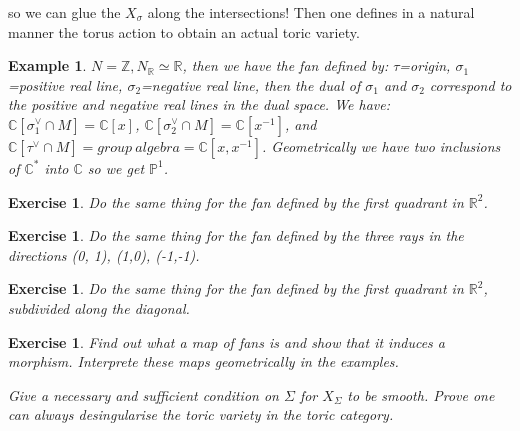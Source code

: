 \documentclass[a4paper]{article}
\newtheorem{eg}[thm]{Example}
\newtheorem{ex}[thm]{Exercise}
\newcommand{\R}{\mathbb{R}}
\newcommand{\C}{\mathbb{C}}
\newcommand{\Z}{\mathbb{Z}}
\begin{document}
	so we can glue the $X_{\sigma}$ along the intersections! 
	Then one defines in a natural manner the torus action to obtain an actual toric variety.
	
	\begin{eg}
		$N=\Z, N_{\R}\simeq \R$, then we have the fan defined by: $\tau$=origin, $\sigma_1$=positive real line, $\sigma_2$=negative real line, then the dual of $\sigma_1$ and $\sigma_2$ correspond to the positive and negative real lines in the dual space. We have: $\C[\sigma_1^{\vee}\cap M]=\C[x] $, $\C[\sigma_2^{\vee}\cap M]=\C[x^{-1}] $, and $\C[\tau^{\vee}\cap M]=group \: algebra=\C[x, x^{-1}] $. Geometrically we have two inclusions of $\C^*$ into $\C$ so we get $\mathbb{P}^1$.
	\end{eg}
	
	\begin{ex}
		Do the same thing for the fan defined by the first quadrant in $\R^2$.
	\end{ex}
	
	\begin{ex}
		Do the same thing for the fan defined by the three rays in the directions (0, 1), (1,0), (-1,-1).
	\end{ex}
	
	
	\begin{ex}
		Do the same thing for the fan defined by the first quadrant in $\R^2$, subdivided along the diagonal.
		
	\end{ex}
	
	
	
	\begin{ex}
		Find out what a map of fans is and show that it induces a morphism. Interprete these maps geometrically in the examples. 
		
		Give a necessary and sufficient condition on  $\Sigma$ for $X_{\Sigma}$ to be smooth.
		Prove one can always desingularise the toric variety in the toric category.
		
	\end{ex}
	
	
\end{document}
